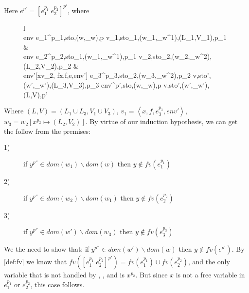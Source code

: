 \item[\runa{App-rec}] Here $e^{p'}=[e_1^{p_1}\;e_2^{p_2}]^{p'}$, where
\begin{figure}[H]
	\setlength\tabcolsep{8pt}
	\begin{tabular}{l}
		\InfName{App-rec}\\[0.2cm]
		\inference[]
				{env \vdash \left\langle e_1^{p_1},sto,(w,\sqsubseteq_w),p \right\rangle \rightarrow \left\langle v_1,sto_1,(w_1,\sqsubseteq_w^1),(L_1,V_1),p_1 \right\rangle &\\
				env \vdash \left\langle e_2^{p_2},sto_1,(w_1,\sqsubseteq_w^1),p_1 \right\rangle \rightarrow \left\langle v_2,sto_2,(w_2,\sqsubseteq_w^2),(L_2,V_2),p_2 \right\rangle &\\
				env'[x\mapsto v_2, f\mapsto\left\langle x,f,e,env'\right\rangle] \vdash \left\langle e_3^{p_3},sto_2,(w_3,\sqsubseteq_w^2),p_2 \right\rangle \rightarrow \left\langle v,sto',(w',\sqsubseteq_w'),(L_3,V_3),p_3 \right\rangle}
				{env\vdash \left\langle \left[e_1^{p_1}\;e_2^{p_2}\right]^{p'},sto,(w,\sqsubseteq_w),p \right\rangle \rightarrow \left\langle v,sto',(w',\sqsubseteq_w'),(L,V),p' \right\rangle}
	\end{tabular}
\end{figure}
Where $(L,V)=(L_1\cup L_3,V_1\cup V_3)$, $v_1=\left\langle x,f,e_3^{p_3},env'\right\rangle$, $w_3=w_2[x^{p_2}\mapsto (L_2,V_2)]$.
By virtue of our induction hypothesis, we can get the follow from the premises:
\begin{description}
	\item[1)] if $y^{p''}\in dom(w_1)\backslash dom(w)$ then $y\notin fv(e_1^{p_1})$
	\item[2)] if $y^{p''}\in dom(w_2)\backslash dom(w_1)$ then $y\notin fv(e_2^{p_2})$
	\item[3)] if $y^{p''}\in dom(w')\backslash dom(w_3)$ then $y\notin fv(e_3^{p_3})$
\end{description}
We the need to show that: if $y^{p''}\in dom(w')\backslash dom(w)$ then $y\notin fv(e^{p'})$.
By \cref{def:fv} we know that $fv([e_1^{p_1}\;e_2^{p_2}]^{p'})=fv(e_1^{p_1})\cup fv(e_2^{p_2})$, and the only variable that is not handled by , , and  is $x^{p_2}$.
But since $x$ is not a free variable in $e_1^{p_1}$ or $e_2^{p_2}$, this case follows.
